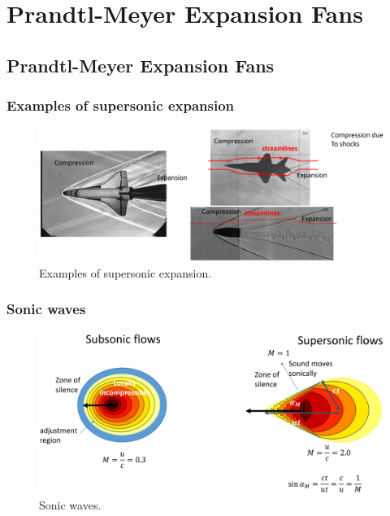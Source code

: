 \chapter{Prandtl-Meyer Expansion Fans}
\section{Prandtl-Meyer Expansion Fans}
\subsection{Examples of supersonic expansion}
\begin{figure}[H]
    \centering
    \includegraphics[width = \textwidth]{./img/diagram18.png}
    \caption{Examples of supersonic expansion.}
\end{figure}
\subsection{Sonic waves}
\begin{figure}[H]
    \centering
    \includegraphics[width = \textwidth]{./img/diagram19.png}
    \caption{Sonic waves.}
\end{figure}
